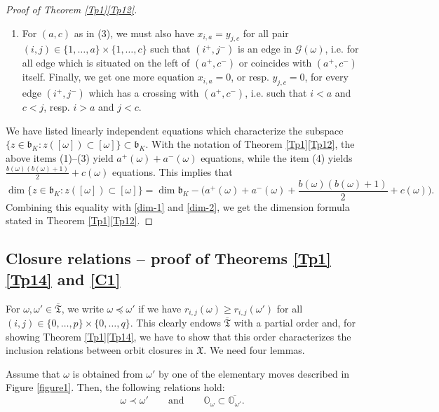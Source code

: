 \documentclass[ALCO,Unicode]{cedram}
\newcommand{\fb}{\mathfrak{b}}
\newcommand{\Xorbit}{\mathbb{O}}
\newcommand{\ppermutationsof}{\mathfrak{T}}
\newcommand{\parameters}{\overline{\ppermutationsof}}
\newcommand{\Xfv}{\mathfrak{X}}
\begin{document}
\begin{proof}[Proof of Theorem \ref{Tp1}\ref{Tp12}]
\begin{enumerate}
and we must have $y_{j,c}=0$ for all $j<c$ such that $j^-$ is a free vertex in $\mathcal{G}(\omega)$.
\item For $(a,c)$ as in (3), we must also have $x_{i,a}=y_{j,c}$ for all pair $(i,j)\in\{1,\ldots,a\}\times\{1,\ldots,c\}$ such that $(i^+,j^-)$ is an edge in $\mathcal{G}(\omega)$, i.e. for all edge which is situated on the left of $(a^+,c^-)$ or coincides with $(a^+,c^-)$ itself. Finally, we get one more equation $x_{i,a}=0$, or resp. $y_{j,c}=0$, for every edge $(i^+,j^-)$ which has a crossing with $(a^+,c^-)$, i.e. such that $i<a$ and $c<j$, resp. $i>a$ and $j<c$.
\end{enumerate}
We have listed linearly independent equations which characterize the subspace $\{z\in\fb_K:z([\omega])\subset[\omega]\}\subset\fb_K$. With the notation of Theorem \ref{Tp1}\ref{Tp12}, the above items (1)--(3) yield $a^+(\omega)+a^-(\omega)$ equations, while the item (4) yields $\frac{b(\omega)(b(\omega)+1)}{2}+c(\omega)$ equations.
This implies that
\[
\dim\{z\in\fb_K:z([\omega])\subset[\omega]\}=\dim\fb_K-\Big(a^+(\omega)+a^-(\omega)+\frac{b(\omega)(b(\omega)+1)}{2}+c(\omega)\Big).
\]
Combining this equality with \eqref{dim-1} and \eqref{dim-2}, we get the dimension formula stated in Theorem \ref{Tp1}\ref{Tp12}.
\end{proof}

\subsection{Closure relations -- proof of Theorems \ref{Tp1}\ref{Tp14} and \ref{C1}}

\label{section-3.3}

For $\omega,\omega'\in\parameters$, we write $\omega\preceq\omega'$ if we have $r_{i,j}(\omega)\geq r_{i,j}(\omega')$ for all
$(i,j)\in\{0,\ldots,p\}\times\{0,\ldots,q\}$.
This clearly endows $\parameters$ with a partial order and, for showing Theorem \ref{Tp1}\ref{Tp14}, we have to show that this order characterizes the inclusion relations between orbit closures in $\Xfv$.
We need four lemmas.

\begin{lemma}
\label{lemma-3.2}\label{L3.4}
Assume that $\omega$ is obtained from $\omega'$ by one of the elementary moves described in Figure \ref{figure1}. Then, the following relations hold:
\[\omega\prec \omega'\qquad\mbox{and}\qquad \Xorbit_\omega\subset\overline{\Xorbit_{\omega'}}.\]
\end{lemma}
\end{document}
